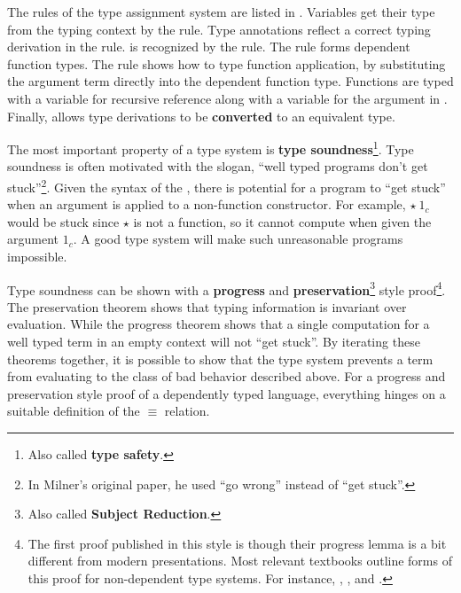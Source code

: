 The rules of the type assignment system are listed in .
Variables get their type from the typing context by the  rule.
Type annotations reflect a correct typing derivation in the  rule.
\Tit{} is recognized by the  rule.
The  rule forms dependent function types.
The  rule shows how to type function application, by substituting the argument term directly into the dependent function type.
Functions are typed with a variable for recursive reference along with a variable for the argument in .
Finally,  allows type derivations to be \textbf{converted} to an equivalent type.
 
The most important property of a type system is \textbf{type soundness}\footnote{
  Also called \textbf{type safety}.
}.
Type soundness is often motivated with the slogan, ``well typed programs don't get stuck''\cite{MILNER1978348}\footnote{
  In Milner's original paper, he used ``go wrong'' instead of ``get stuck''.
}.
Given the syntax of the \slang{}, there is potential for a program to ``get stuck'' when an argument is applied to a non-function constructor.
For example, $\star\ 1_{c}$ would be stuck since $\star$ is not a function, so it cannot compute when given the argument $1_{c}$.
A good type system will make such unreasonable programs impossible.
 
Type soundness can be shown with a \textbf{progress} and \textbf{preservation}\footnote{
  Also called \textbf{Subject Reduction}.
} style proof\footnote{
  The first proof published in this style is \cite{WRIGHT199438} though their progress lemma is a bit different from modern presentations.
  Most relevant textbooks outline forms of this proof for non-dependent type systems.
  For instance, \cite[Part 2]{pierce2002types}, \cite{KOKKE2020102440}, and \cite[Chapter 11]{chlipala2017formal}.
}. 
The preservation theorem shows that typing information is invariant over evaluation.
While the progress theorem shows that a single computation for a well typed term in an empty context will not ``get stuck''.
By iterating these theorems together, it is possible to show that the type system prevents a term from evaluating to the class of bad behavior described above.
For a progress and preservation style proof of a dependently typed language, everything hinges on a suitable definition of the $\equiv$ relation.
 
